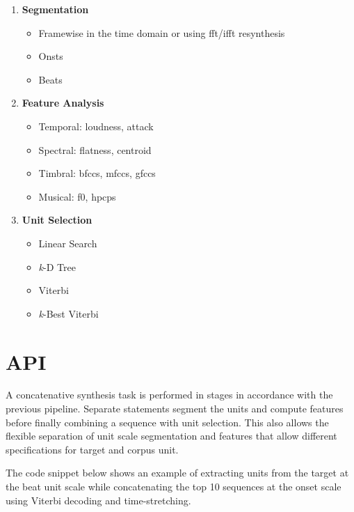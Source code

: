 \begin{enumerate}
  \item \textbf{Segmentation}
\begin{itemize}
  \item Framewise in the time domain or using \acrshort{fft}/\acrshort{ifft} resynthesis 
  \item Onsts
  \item Beats
\end{itemize}
\item \textbf{Feature Analysis}
\begin{itemize}
\item Temporal: loudness, attack
\item Spectral: flatness, centroid
\item Timbral: \acrshort{bfcc}s, \acrshort{mfcc}s, \acrshort{gfcc}s
\item Musical: f0, \acrshort{hpcp}s
\end{itemize}
\item \textbf{Unit Selection}
\begin{itemize}
  \item Linear Search
  \item \textit{k}-D Tree
  \item Viterbi
  \item \textit{k}-Best Viterbi
\end{itemize}
\end{enumerate}

\section{API}

A concatenative synthesis task is performed in stages in accordance with the previous pipeline. Separate statements segment the units and compute features before finally combining a sequence with unit selection. This also allows the flexible separation of unit scale segmentation and features that allow different specifications for target and corpus unit. 

The code snippet below shows an example of extracting units from the target at the beat unit scale while concatenating the top 10 sequences at the onset scale using Viterbi decoding and time-stretching.



